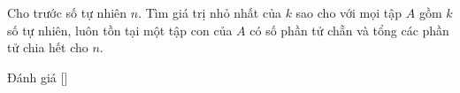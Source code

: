 \ifshowproblem
\begin{problem}\label{problem:IRN-2015-TST1-P4}
	Cho trước số tự nhiên \( n \). Tìm giá trị nhỏ nhất của \( k \) sao cho với mọi tập \( A \) gồm \( k \) số tự nhiên,
	luôn tồn tại một tập con của \( A \) có số phần tử chẵn và tổng các phần tử chia hết cho \( n \).
\end{problem}
\fi

\ifshowinfo
Đánh giá [\textbf{}]\footnotemark
{}
\fi